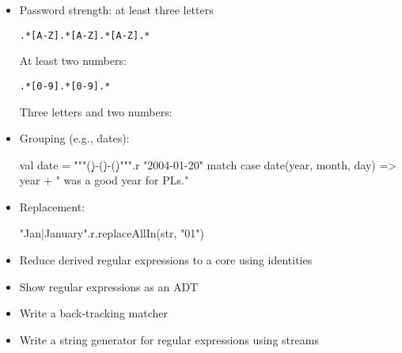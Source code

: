 \documentclass[9pt]{extbook}
\begin{document}
\begin{itemize}

\item Password strength: at least three letters

\begin{verbatim}
.*[A-Z].*[A-Z].*[A-Z].*
\end{verbatim}

At least two numbers:

\begin{verbatim}
.*[0-9].*[0-9].*
\end{verbatim}

Three letters and two numbers:

\item Grouping (e.g., dates):

\begin{scalacode}
    val date = """(\d\d\d\d)-(\d\d)-(\d\d)""".r
    "2004-01-20" match {
      case date(year, month, day) => year + " was a good year for PLs."
    }
\end{scalacode}

\item Replacement:

\begin{scalacode}
"Jan|January".r.replaceAllIn(str, "01")
\end{scalacode}

\item Reduce derived regular expressions to a core using identities

\item Show regular expressions as an ADT

\item Write a back-tracking matcher

\item Write a string generator for regular expressions using streams

\end{itemize}
\end{document}
